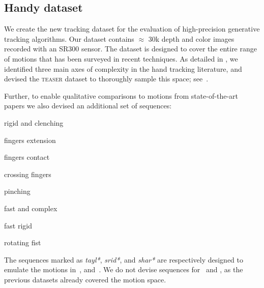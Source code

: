 
\subsection*{Handy dataset}
We create the new \handy{} tracking dataset for the evaluation of high-precision generative tracking algorithms. Our dataset contains $\approx$ 30k depth and color images recorded with an \realsense{} SR300 sensor. The dataset is designed to cover the entire range of motions that has been surveyed in recent techniques. As detailed in , we identified three main axes of complexity in the hand tracking literature, and devised the \textsc{teaser} dataset to thoroughly sample this space; see~\VideoSpace{}. 
% 
% 

Further, to enable qualitative comparisons to motions from state-of-the-art papers we also devised an additional set of sequences:
\begin{description}[labelsep=0em,labelwidth=1.6in,labelindent=1cm,itemsep=-.6em]
    \item[\VideoExtraTaylOne{} -- \textsc{tayl1}] rigid and clenching
    \item[\VideoExtraSridOne{} -- \textsc{srid1}] fingers extension 
    \item[\VideoExtraSridTwo{} -- \textsc{srid2}] fingers contact
    \item[\VideoExtraSridThree{} -- \textsc{srid3}] crossing fingers
    \item[\VideoExtraSridFour{} -- \textsc{srid4}] pinching
    \item[\VideoExtraSharOne{} -- \textsc{shar1}] fast and complex
    \item[\VideoExtraSharTwo{} -- \textsc{shar2}] fast rigid 
    \item[\VideoExtraSharThree{} -- \textsc{shar3}] rotating fist
\end{description}
The sequences marked as \emph{tayl*}, \emph{srid*}, and \emph{shar*} are respectively designed to emulate the motions in~\cite{taylor2016concerto}, \cite{sridhar2015fast} and~\cite{sharp2015accurate}. We do not devise sequences for~\cite{qian2014realtime} and \cite{tompson2014real}, as the previous datasets already covered the motion space.

